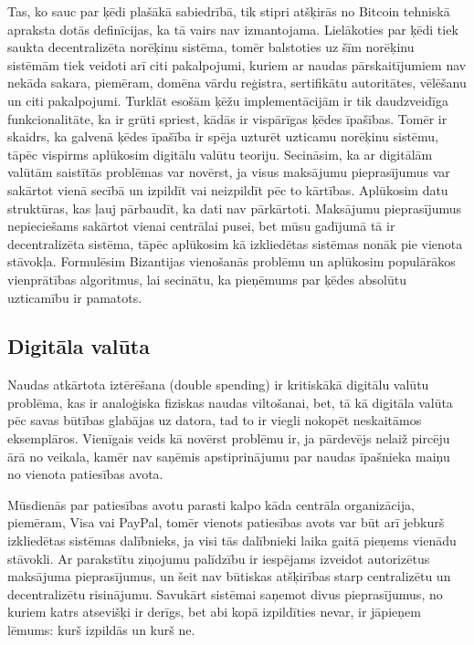 Tas, ko sauc par ķēdi plašākā sabiedrībā, tik stipri atšķirās no Bitcoin tehniskā apraksta\cite{nakamoto08} dotās definīcijas, ka tā vairs nav izmantojama. 
Lielākoties par ķēdi tiek saukta decentralizēta norēķinu sistēma, tomēr balstoties uz šīm norēķinu sistēmām tiek veidoti arī citi pakalpojumi, kuriem ar naudas pārskaitījumiem nav nekāda sakara, piemēram, domēna vārdu reģistra, sertifikātu autoritātes, vēlēšanu un citi pakalpojumi.\cite{namecoin}
Turklāt esošām ķēžu implementācijām ir tik daudzveidīga funkcionalitāte, ka ir grūti spriest, kādās ir vispārīgas ķēdes īpašības. 
Tomēr ir skaidrs, ka galvenā ķēdes īpašība ir spēja uzturēt uzticamu norēķinu sistēmu, tāpēc vispirms aplūkosim digitālu valūtu teoriju.
Secināsim, ka ar digitālām valūtām saistītās problēmas var novērst, ja visus maksājumu pieprasījumus var sakārtot vienā secībā un izpildīt vai neizpildīt pēc to kārtības. Aplūkosim datu struktūras, kas ļauj pārbaudīt, ka dati nav pārkārtoti.
Maksājumu pieprasījumus nepieciešams sakārtot vienai centrālai pusei, bet mūsu gadījumā tā ir decentralizēta sistēma, tāpēc aplūkosim kā izkliedētas sistēmas nonāk pie vienota stāvokļa. Formulēsim Bizantijas vienošanās problēmu un aplūkosim populārākos vienprātības algoritmus, lai secinātu, ka pieņēmums par ķēdes absolūtu uzticamību ir pamatots.

\subsection{Digitāla valūta}
Naudas atkārtota iztērēšana (double spending) ir kritiskākā digitālu valūtu problēma, kas ir analoģiska fiziskas naudas viltošanai, bet, tā kā digitāla valūta pēc savas būtības glabājas uz datora, tad to ir viegli nokopēt neskaitāmos eksemplāros. Vienīgais veids kā novērst problēmu ir, ja pārdevējs nelaiž pircēju ārā no veikala, kamēr nav saņēmis apstiprinājumu par naudas īpašnieka maiņu no vienota patiesības avota.\cite{frankel96}

Mūsdienās par patiesības avotu parasti kalpo kāda centrāla organizācija, piemēram, Visa vai PayPal, tomēr vienots patiesības avots var būt arī jebkurš izkliedētas sistēmas dalībnieks, ja visi tās dalībnieki laika gaitā pieņems vienādu stāvokli.
Ar parakstītu ziņojumu palīdzību ir iespējams izveidot autorizētus maksājuma pieprasījumus, un šeit nav būtiskas atšķirības starp centralizētu un decentralizētu risinājumu. Savukārt sistēmai saņemot divus pieprasījumus, no kuriem katrs atsevišķi ir derīgs, bet abi kopā izpildīties nevar, ir jāpieņem lēmums: kurš izpildās un kurš ne.

